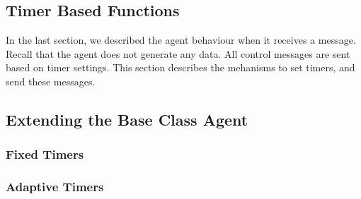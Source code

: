 \documentclass{article}
\begin{document}
\subsection{Timer Based Functions}
\label{sec:timers}

In the last section,
we described the agent behaviour when it receives a message.
Recall that the agent does not generate any data.
All control messages are sent based on timer settings.
This section describes the mehanisms to set timers, and send these messages.



\subsection{Extending the Base Class Agent}
\label{sec:extensions}


\subsubsection{Fixed Timers}


\subsubsection{Adaptive Timers}
\end{document}
